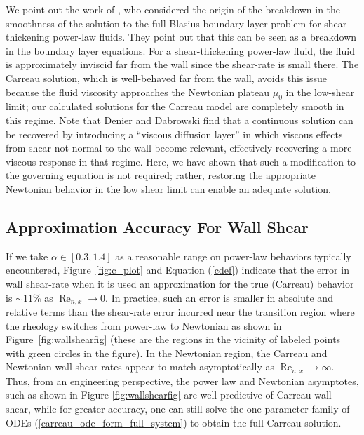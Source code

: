 \documentclass[lineno]{JFM-FLM_Au}
\begin{document}
We point out the work of \citet{Dabrowski}, who considered the origin of the breakdown in the smoothness of the solution to the full Blasius boundary layer problem for shear-thickening power-law fluids. They point out that this can be seen as a breakdown in the boundary layer equations. For a shear-thickening power-law fluid, the fluid is approximately inviscid far from the wall since the shear-rate is small there. The Carreau solution, which is well-behaved far from the wall, avoids this issue because the fluid viscosity approaches the Newtonian plateau $\mu_0$ in the low-shear limit; our calculated solutions for the Carreau model are completely smooth in this regime. Note that Denier and Dabrowski find that a continuous solution can be recovered by introducing a ``viscous diffusion layer'' in which viscous effects from shear not normal to the wall become relevant, effectively recovering a more viscous response in that regime. Here, we have shown that such a modification to the governing equation is not required; rather, restoring the appropriate Newtonian behavior in the low shear limit can enable an adequate solution.

\subsection{Approximation Accuracy For Wall Shear}

\hspace{\parindent}If we take $\alpha \in [0.3, 1.4]$ as a reasonable range on power-law behaviors typically encountered, Figure~\ref{fig:c_plot} and Equation (\ref{cdef}) indicate that the error in wall shear-rate when it is used an approximation for the true (Carreau) behavior is $\sim 11\%$ as $\operatorname{Re}_{n, x} \to 0$. In practice, such an error is smaller in absolute and relative terms than the shear-rate error incurred near the transition region where the rheology switches from power-law to Newtonian as shown in Figure~\ref{fig:wallshearfig}  (these are the regions in the vicinity of labeled points with green circles in the figure). In the Newtonian region, the Carreau and Newtonian wall shear-rates appear to match asymptotically as $\operatorname{Re}_{n, x} \to \infty$.  Thus, from an engineering perspective, the power law and Newtonian asymptotes, such as shown in Figure \ref{fig:wallshearfig} are well-predictive of Carreau wall shear, while for greater accuracy, one can still solve the one-parameter family of ODEs (\ref{carreau_ode_form_full_system}) to obtain the full Carreau solution.
\end{document}
